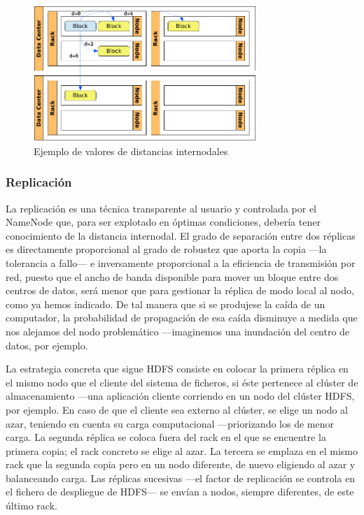 \begin{figure}[tbp]
\begin{center}
\includegraphics[width=0.75\textwidth]{imagenes/018.pdf}
 \caption{Ejemplo de valores de distancias internodales}
\label{fig:distnodos}
\end{center}
\end{figure}



\subsubsection{Replicaci\'on}\label{subsubsec:replicacionbloques}
\noindent La replicaci\'on es una t\'ecnica transparente al usuario y controlada por el NameNode que, para ser explotado en \'optimas condiciones, deber\'ia tener conocimiento de la distancia internodal. El grado de separaci\'on entre dos r\'eplicas es directamente proporcional al grado de robustez que aporta la copia ---la tolerancia a fallo--- e inversamente proporcional a la eficiencia de transmisi\'on por red, puesto que el ancho de banda disponible para mover un bloque entre dos centros de datos, ser\'a menor que para gestionar la r\'eplica de modo local al nodo, como ya hemos indicado. De tal manera que si se produjese la ca\'ida de un computador, la probabilidad de propagaci\'on de esa ca\'ida disminuye a medida que nos alejamos del nodo problem\'atico ---imaginemos una inundaci\'on del centro de datos, por ejemplo.\newline

La estrategia concreta que sigue HDFS consiste en colocar la primera r\'eplica en el mismo nodo que el cliente del sistema de ficheros, si \'este pertenece al cl\'uster de almacenamiento ---una aplicaci\'on cliente corriendo en un nodo del cl\'uster HDFS, por ejemplo. En caso de que el cliente sea externo al cl\'uster, se elige un nodo al azar, teniendo en cuenta su carga computacional ---prio\-ri\-zan\-do los de menor carga. La segunda r\'eplica se coloca fuera del rack en el que se encuentre la primera copia; el rack concreto se elige al azar. La tercera se emplaza en el mismo rack que la segunda copia pero en un nodo diferente, de nuevo eligiendo al azar y balanceando carga. Las r\'eplicas sucesivas ---el factor de replicaci\'on se controla en el fichero de despliegue de HDFS--- se env\'ian a nodos, siempre diferentes, de este \'ultimo rack.\newline

